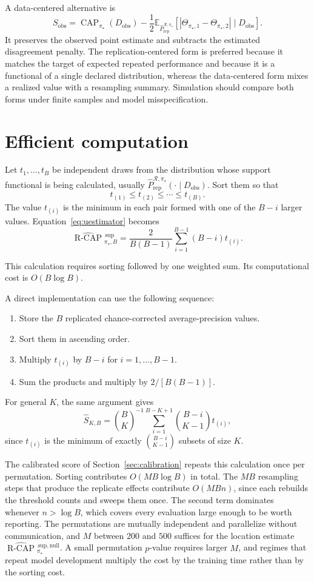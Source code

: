 \documentclass[11pt]{article}
\newcommand{\CAP}{\operatorname{CAP}}
\newcommand{\Regime}{\mathcal{R}}
\newcommand{\Tpi}{\CAP_{\pi_\star}}
\newcommand{\E}{\mathbb{E}}
\newcommand{\RCAPHatB}{\widehat{\operatorname{R\text{-}CAP}}{}^{\,\mathrm{sup}}_{\pi_\star,B}}
\newcommand{\RCAPnullHat}{\widehat{\operatorname{R\text{-}CAP}}{}^{\,\mathrm{sup,null}}_{\pi_\star}}
\newcommand{\PRepHat}{\widehat{P}_{\mathrm{rep}}^{\Regime,\pi_\star}}
\theoremstyle{remark}
\begin{document}
A data-centered alternative is
\[
S_{\mathrm{obs}}
=
\Tpi(D_{\mathrm{obs}})
-
\frac12
\E_{\PRepHat}
\left[
|\Theta_{\pi_\star,1}-\Theta_{\pi_\star,2}|
\mid D_{\mathrm{obs}}
\right].
\]
It preserves the observed point estimate and subtracts the estimated disagreement penalty. The replication-centered form is preferred because it matches the target of expected repeated performance and because it is a functional of a single declared distribution, whereas the data-centered form mixes a realized value with a resampling summary. Simulation should compare both forms under finite samples and model misspecification.

\section{Efficient computation}
\label{app:computation}

Let $t_1,\ldots,t_B$ be independent draws from the distribution whose support functional is being calculated, usually $\PRepHat(\cdot\mid D_{\mathrm{obs}})$. Sort them so that
\[
t_{(1)}\leq t_{(2)}\leq\cdots\leq t_{(B)}.
\]
The value $t_{(i)}$ is the minimum in each pair formed with one of the $B-i$ larger values. Equation~\eqref{eq:uestimator} becomes
\begin{equation}
\RCAPHatB
=
\frac{2}{B(B-1)}
\sum_{i=1}^{B-1}(B-i)t_{(i)}.
\label{eq:sorted}
\end{equation}

This calculation requires sorting followed by one weighted sum. Its computational cost is $O(B\log B)$.

A direct implementation can use the following sequence:

\begin{enumerate}
\item Store the $B$ replicated chance-corrected average-precision values.
\item Sort them in ascending order.
\item Multiply $t_{(i)}$ by $B-i$ for $i=1,\ldots,B-1$.
\item Sum the products and multiply by $2/[B(B-1)]$.
\end{enumerate}

For general $K$, the same argument gives
\[
\widehat S_{K,B}
=
\binom{B}{K}^{-1}
\sum_{i=1}^{B-K+1}
\binom{B-i}{K-1}
t_{(i)},
\]
since $t_{(i)}$ is the minimum of exactly $\binom{B-i}{K-1}$ subsets of size $K$.

The calibrated score of Section~\ref{sec:calibration} repeats this calculation once per permutation. Sorting contributes $O(MB\log B)$ in total. The $MB$ resampling steps that produce the replicate effects contribute $O(MBn)$, since each rebuilds the threshold counts and sweeps them once. The second term dominates whenever $n>\log B$, which covers every evaluation large enough to be worth reporting. The permutations are mutually independent and parallelize without communication, and $M$ between $200$ and $500$ suffices for the location estimate $\RCAPnullHat$. A small permutation $p$-value requires larger $M$, and regimes that repeat model development multiply the cost by the training time rather than by the sorting cost.
\end{document}
